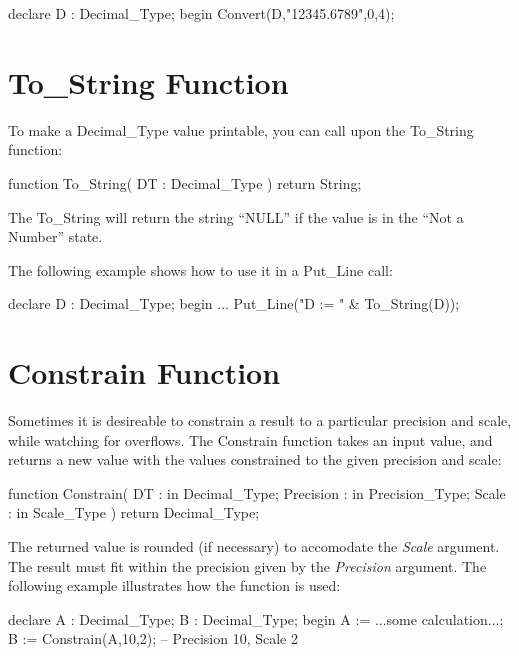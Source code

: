 \documentclass[english,letterpaper]{book}
\begin{document}
\begin{Example}
declare
   D : Decimal_Type;
begin
   Convert(D,"12345.6789",0,4);
\end{Example}

\section{To\_String Function}

To make a Decimal\_Type value printable, you can call upon the To\_String
function:

\begin{Code}
function To_String(
   DT : Decimal_Type
) return String;
\end{Code}

The To\_String will return the string ``NULL'' if the value is
in the ``Not a Number'' state.

The following example shows how to use it in a Put\_Line call:

\begin{Example}
declare
   D : Decimal_Type;
begin
   ...
   Put_Line("D := " & To_String(D));
\end{Example}

\section{Constrain Function}

Sometimes it is desireable to constrain
a result to a particular precision and scale, while watching for overflows.
The Constrain function takes an input value, and returns a new value
with the values constrained to the given precision and scale:

\begin{Code}
function Constrain(
   DT :        in Decimal_Type;
   Precision : in Precision_Type;
   Scale :     in Scale_Type
) return Decimal_Type;
\end{Code}

The returned value is rounded (if necessary) to accomodate the \emph{Scale}
argument. The result must fit within the precision given by the \emph{Precision}
argument. The following example illustrates how the function is used:

\begin{Example}
declare
   A : Decimal_Type;
   B : Decimal_Type;
begin
   A := ...some calculation...;
   B := Constrain(A,10,2);  -- Precision 10, Scale 2
\end{Example}
\end{document}

